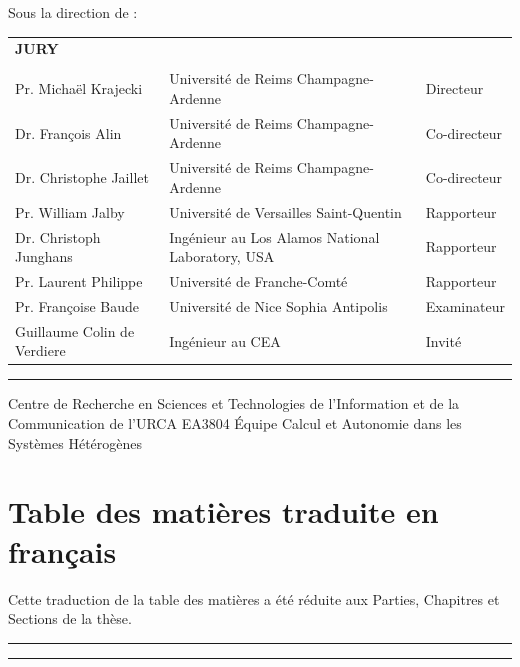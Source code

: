 \documentclass[12pt,a4paper]{report}
\begin{document}
{%
{
	Sous la direction de :\\ 
	\textbf{\phdDirector}
	\vspace{0.5cm}
}

{
\normalsize
\begin{tabular}{l l l}
		\textbf{JURY} &  & \\
		&&\\
		Pr. Michaël Krajecki & Université de Reims Champagne-Ardenne & Directeur \\
		Dr. François Alin & Université de Reims Champagne-Ardenne & Co-directeur  \\
		Dr. Christophe Jaillet & Université de Reims Champagne-Ardenne & Co-directeur \\
		Pr. William Jalby & Université de Versailles Saint-Quentin & Rapporteur\\
		Dr. Christoph Junghans & Ingénieur au Los Alamos National Laboratory, USA & Rapporteur \\
		Pr. Laurent Philippe & Université de Franche-Comté & Rapporteur \\ 
		Pr. Françoise Baude & Université de Nice Sophia Antipolis& Examinateur\\
		Guillaume Colin de Verdiere & Ingénieur au CEA & Invit\'e
\end{tabular}
\vspace{0.5cm}
\hrule
\vspace{0.3cm}
}

{
	Centre de Recherche en Sciences et Technologies de l'Information et de la Communication de l'URCA EA3804
}
{
	\'Equipe Calcul et Autonomie dans les Systèmes Hétérogènes
}

}

\clearpage 
{}



\section*{Table des matières traduite en français}
Cette traduction de la table des matières a été réduite aux Parties, Chapitres et Sections de la thèse. 
\vspace{.2cm}
\hrule
\makeatletter

\makeatother
\vspace{.2cm}
\hrule
\end{document}
